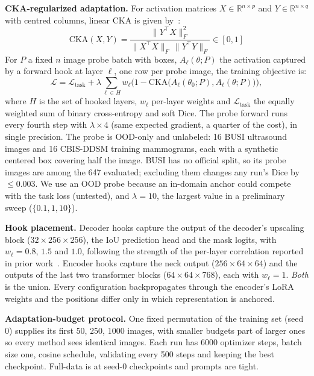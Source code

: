 \documentclass[runningheads]{llncs}
\begin{document}
\textbf{CKA-regularized adaptation.} For activation matrices $X \in \mathbb{R}^{n \times p}$ and $Y \in \mathbb{R}^{n \times q}$ with centred columns, linear CKA is given by~\cite{kornblith2019cka}:
\begin{equation}
  \mathrm{CKA}(X, Y) = \frac{\lVert Y^\top X \rVert_F^2}{\lVert X^\top X \rVert_F \,\lVert Y^\top Y \rVert_F} \in [0,1]
\end{equation}
For $P$ a fixed $n$ image probe batch with boxes, $A_\ell(\theta; P)$ the activation captured by a forward hook at layer $\ell$, one row per probe image, the training objective is:
\begin{equation}
  \mathcal{L} = \mathcal{L}_{\text{task}} + \lambda \sum_{\ell \in H} w_\ell \bigl(1 - \mathrm{CKA}\bigl(A_\ell(\theta_0; P), A_\ell(\theta; P)\bigr)\bigr),
  \label{eq:loss}
\end{equation}
where $H$ is the set of hooked layers, $w_\ell$ per-layer weights and $\mathcal{L}_{\text{task}}$ the equally weighted sum of binary cross-entropy and soft Dice. The probe forward runs every fourth step with $\lambda \times 4$ (same expected gradient, a quarter of the cost), in single precision. The probe is OOD-only and unlabeled: 16 BUSI ultrasound images and 16 CBIS-DDSM training mammograms, each with a synthetic centered box covering half the image. BUSI has no official split, so its probe images are among the 647 evaluated; excluding them changes any run's Dice by $\leq 0.003$. We use an OOD probe because an in-domain anchor could compete with the task loss (untested), and $\lambda = 10$, the largest value in a preliminary sweep ($\{0.1, 1, 10\}$).

\textbf{Hook placement.} Decoder hooks capture the output of the decoder's upscaling block ($32 \times 256 \times 256$), the IoU prediction head and the mask logits, with $w_\ell = 0.8$, $1.5$ and $1.0$, following the strength of the per-layer correlation reported in prior work~\cite{prior2026safer}. Encoder hooks capture the neck output ($256 \times 64 \times 64$) and the outputs of the last two transformer blocks ($64 \times 64 \times 768$), each with $w_\ell = 1$. \emph{Both} is the union. Every configuration backpropagates through the encoder's LoRA weights and the positions differ only in which representation is anchored.

\textbf{Adaptation-budget protocol.} One fixed permutation of the training set (seed 0) supplies its first 50, 250, 1000 images, with smaller budgets part of larger ones so every method sees identical images. Each run has 6000 optimizer steps, batch size one, cosine schedule, validating every 500 steps and keeping the best checkpoint. Full-data is at seed-0 checkpoints and prompts are tight.
\end{document}
